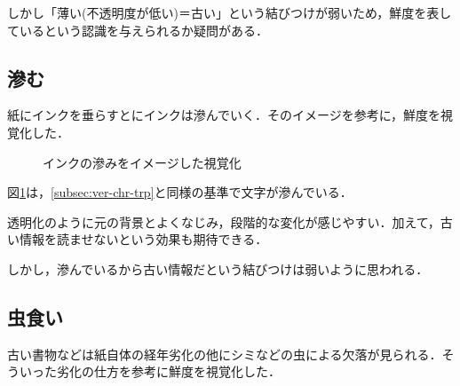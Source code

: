 しかし「薄い(不透明度が低い)＝古い」という結びつけが弱いため，鮮度を表しているという認識を与えられるか疑問がある．

\subsection{滲む}
\label{subsec:ver-chr-bld}

紙にインクを垂らすとにインクは滲んでいく．そのイメージを参考に，鮮度を視覚化した．

\begin{figure}[htbp]
  \begin{center}
  \end{center}
  \caption{インクの滲みをイメージした視覚化}
  \label{fig:ver-bleeding}
\end{figure}

図\ref{fig:ver-bleeding}は，\ref{subsec:ver-chr-trp}と同様の基準で文字が滲んでいる．

透明化のように元の背景とよくなじみ，段階的な変化が感じやすい．加えて，古い情報を読ませないという効果も期待できる．

しかし，滲んでいるから古い情報だという結びつけは弱いように思われる．

\subsection{虫食い}
\label{subsec:ver-chr-wh}

古い書物などは紙自体の経年劣化の他にシミなどの虫による欠落が見られる．そういった劣化の仕方を参考に鮮度を視覚化した．

